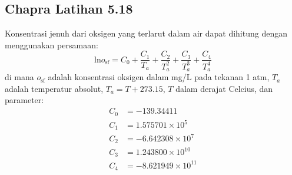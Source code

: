 \subsection{Chapra Latihan 5.18}

Konsentrasi jenuh dari oksigen yang terlarut dalam air dapat
dihitung dengan menggunakan persamaan:
\begin{equation*}
\mathrm{ln}o_{\mathrm{sf}} = C_{0} + \frac{C_{1}}{T_{a}} +
\frac{C_{2}}{T_{a}^{2}} + \frac{C_{3}}{T_{a}^{3}} +
\frac{C_{4}}{T_{a}^{4}}
\end{equation*}
di mana $o_{\mathrm{sf}}$ adalah konsentrasi oksigen dalam mg/L pada tekanan
1 atm, $T_{a}$ adalah temperatur absolut, $T_{a} = T + 273.15$, $T$ dalam
derajat Celcius, dan parameter:
\begin{align*}
C_{0} & = -139.34411 \\
C_{1} & = 1.575701 \times 10^5 \\
C_{2} & = -6.642308 \times 10^7 \\
C_{3} & = 1.243800 \times 10^{10} \\
C_{4} & = -8.621949 \times 10^{11} \\
\end{align*}
